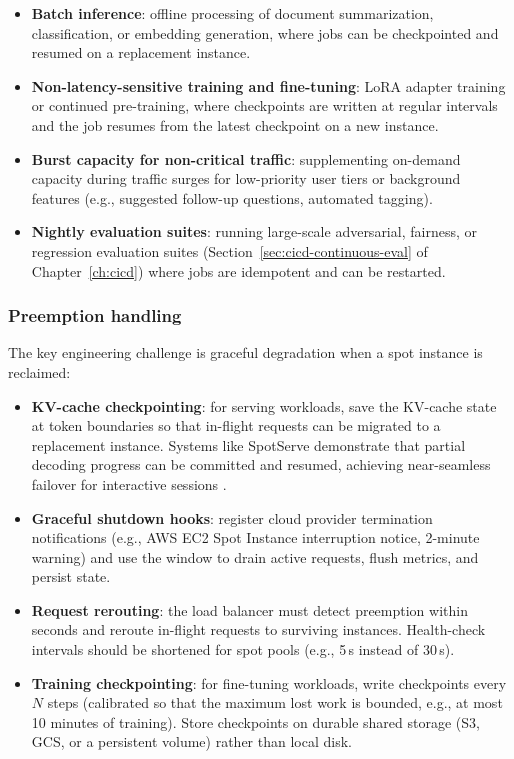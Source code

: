 \begin{itemize}
    \item \textbf{Batch inference}: offline processing of document summarization, classification, or embedding generation, where jobs can be checkpointed and resumed on a replacement instance.
    \item \textbf{Non-latency-sensitive training and fine-tuning}: LoRA adapter training or continued pre-training, where checkpoints are written at regular intervals and the job resumes from the latest checkpoint on a new instance.
    \item \textbf{Burst capacity for non-critical traffic}: supplementing on-demand capacity during traffic surges for low-priority user tiers or background features (e.g., suggested follow-up questions, automated tagging).
    \item \textbf{Nightly evaluation suites}: running large-scale adversarial, fairness, or regression evaluation suites (Section~\ref{sec:cicd-continuous-eval} of Chapter~\ref{ch:cicd}) where jobs are idempotent and can be restarted.
\end{itemize}

\subsubsection{Preemption handling}
The key engineering challenge is graceful degradation when a spot instance is reclaimed:

\begin{itemize}
    \item \textbf{KV-cache checkpointing}: for serving workloads, save the KV-cache state at token boundaries so that in-flight requests can be migrated to a replacement instance. Systems like SpotServe demonstrate that partial decoding progress can be committed and resumed, achieving near-seamless failover for interactive sessions \cite{pope2023exegpt}.
    \item \textbf{Graceful shutdown hooks}: register cloud provider termination notifications (e.g., AWS EC2 Spot Instance interruption notice, 2-minute warning) and use the window to drain active requests, flush metrics, and persist state.
    \item \textbf{Request rerouting}: the load balancer must detect preemption within seconds and reroute in-flight requests to surviving instances. Health-check intervals should be shortened for spot pools (e.g., 5\,s instead of 30\,s).
    \item \textbf{Training checkpointing}: for fine-tuning workloads, write checkpoints every $N$ steps (calibrated so that the maximum lost work is bounded, e.g., at most 10 minutes of training). Store checkpoints on durable shared storage (S3, GCS, or a persistent volume) rather than local disk.
\end{itemize}

